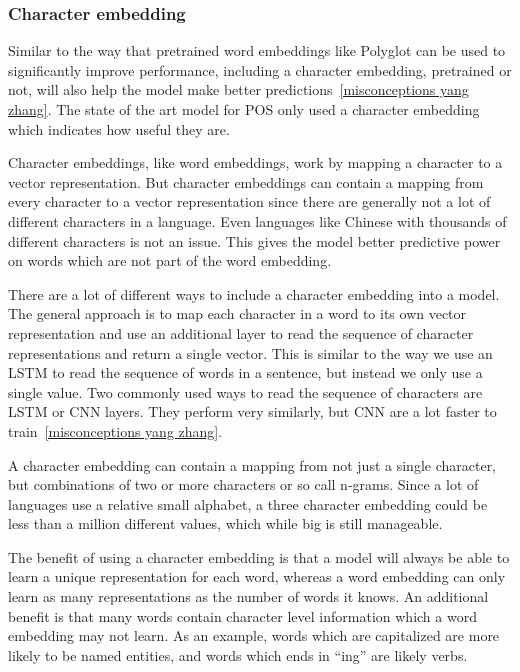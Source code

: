 \subsubsection{Character embedding}

Similar to the way that pretrained word embeddings like Polyglot can be used to
significantly improve performance, including a character embedding, pretrained
or not, will also help the model make better predictions~\ref{misconceptions
yang zhang}. The state of the art model for POS only used a character embedding
which indicates how useful they are.

Character embeddings, like word embeddings, work by mapping a character to a
vector representation. But character embeddings can contain a mapping from every
character to a vector representation since there are generally not a lot of
different characters in a language. Even languages like Chinese with thousands
of different characters is not an issue. This gives the model better predictive
power on words which are not part of the word embedding.

There are a lot of different ways to include a character embedding into a model.
The general approach is to map each character in a word to its own vector
representation and use an additional layer to read the sequence of character
representations and return a single vector. This is similar to the way we use an
LSTM to read the sequence of words in a sentence, but instead we only use a
single value. Two commonly used ways to read the sequence of characters are LSTM
or CNN layers. They perform very similarly, but CNN are a lot faster to
train~\ref{misconceptions yang zhang}.

A character embedding can contain a mapping from not just a single character,
but combinations of two or more characters or so call n-grams. Since a lot of
languages use a relative small alphabet, a three character embedding could be
less than a million different values, which while big is still manageable.

The benefit of using a character embedding is that a model will always be able
to learn a unique representation for each word, whereas a word embedding can
only learn as many representations as the number of words it knows. An
additional benefit is that many words contain character level information which
a word embedding may not learn. As an example, words which are capitalized are
more likely to be named entities, and words which ends in ``ing'' are likely
verbs.

